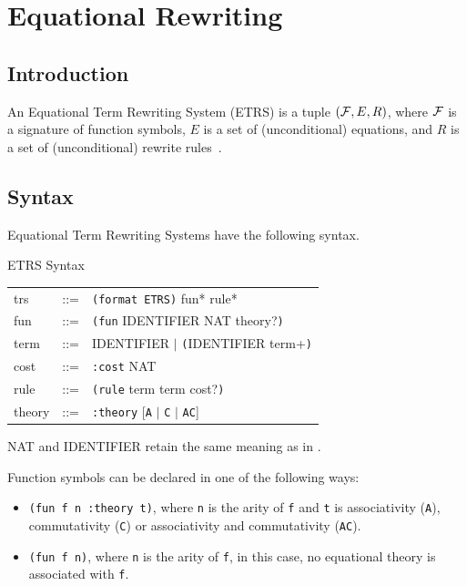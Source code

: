 \chapter{Equational Rewriting}\label{chap:ETRS}

\section{Introduction}

An Equational Term Rewriting System (ETRS) is a tuple $({\cal F},E,R)$, where 
${\cal F}$ is a signature of function symbols,
$E$ is a set of (unconditional) equations, and
$R$ is a set of (unconditional) rewrite rules~\cite{jouannaud1983ConfluentCoherentEquational}.


\section{Syntax}

Equational Term Rewriting Systems have the following syntax.

\begin{grammar}{ETRS Syntax}
  \begin{tabular}{lll}
  trs & ::= & \texttt{(format ETRS)} fun* rule* \\
  fun & ::= & \texttt{(fun} IDENTIFIER NAT theory?\texttt{)} \\
  term & ::= & IDENTIFIER $|$ \texttt{(}IDENTIFIER term+\texttt{)} \\
  cost & ::= & \texttt{:cost} NAT \\
  rule & ::= & \texttt{(rule} term term cost?\texttt{)} \\
  theory & ::= & \texttt{:theory} [\texttt{A} $\mid$ \texttt{C} $\mid$ \texttt{AC}]
  \end{tabular}
\end{grammar}

NAT and IDENTIFIER retain the same meaning as in .

Function symbols can be declared in one of the following ways:

\begin{itemize}
  \item \texttt{(fun f n :theory t)}, where \texttt{n} is the arity of \texttt{f} and \texttt{t} is associativity (\texttt{A}), commutativity (\texttt{C}) or associativity and commutativity (\texttt{AC}).
  \item \texttt{(fun f n)}, where \texttt{n} is the arity of \texttt{f}, in this case, no equational theory is associated with \texttt{f}.
\end{itemize}

